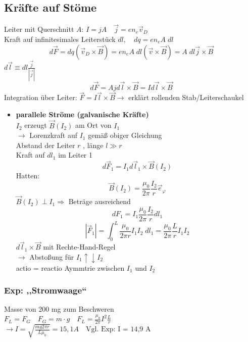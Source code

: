 \documentclass[titlepage,12pt,a4paper,ngerman]{report}
\newcommand{\tx}[1]{\textrm{#1}}
\begin{document}
\subsection{Kräfte auf Stöme}
Leiter mit Querschnitt $ A $: $ I = j A \quad \vec{j} = e n_e \vec{v}_D $\\
Kraft auf infinitesimales Leiterstück $ dl, \quad dq = e n_e A \; dl $\\
$$ d\vec{F} = dq (\vec{v}_D \times \vec{B}) = e n_e A\; dl (\vec{v} \times \vec{B}) = A \; dl \vec{j} \times \vec{B} $$
$ d\vec{l} \equiv dl \frac{\vec{j}}{| \vec{j} |}$\\
$$ d\vec{F} = A j d\vec{l} \times \vec{B} = I d\vec{l} \times \vec{B} $$
Integration über Leiter: $ \vec{F} = I \vec{l} \times \vec{B} \rightarrow $ erklärt rollenden Stab/Leiterschaukel\\
\begin{itemize}
	\item \textbf{parallele Ströme (galvanische Kräfte)}\\
	$ I_2 $ erzeugt $ \vec{B} (I_2) $ am Ort von $ I_1 $\\
	$ \rightarrow $ Lorenzkraft auf $ I_1 $ gemäß obiger Gleichung\\
	Abstand der Leiter $ r $ , länge $ l \gg r $\\
	Kraft auf $  dl_1 $ im Leiter 1\\
	$$ d\vec{F}_1  = I_1 d\vec{l}_1 \times \vec{B}(I_2) $$
	Hatten: $$ \vec{B}(I_2) = \frac{\mu_0}{2 \pi} \frac{I_2}{r} \vec{e}_\varphi $$
	$ \vec{B} (I_2) \perp I_1 \Rightarrow $ Beträge ausreichend\\
	$$ dF_1 = I_1 \frac{ \mu_0}{2 \pi} \frac{I_2}{r} dl_1 $$
	$$\boxed{ |\vec{F}_1 | = \int_0 ^L \frac{\mu _0}{2 \pi r } I_1 I_2 \; dl_1 = \frac{\mu_0}{2 \pi} \frac{L}{r} I_1 I_2}$$
	$ d\vec{l}_1 \times \vec{B} $ mit Rechte-Hand-Regel\\
	$ \rightarrow $ Abstoßung für $ I_1 \uparrow \downarrow I_2 $\\
	actio = reactio Aymmtrie zwischen $ I_1 $ und $ I_2 $ \\
\end{itemize}
\subsubsection{Exp: ,,Stromwaage``} 
Masse von 200 mg zum Beschweren\\
$ F_L = F_G \quad F_G = m \cdot g \quad F_L = \frac{\mu_0}{2 \pi} I^2 \frac{L}{r} $\\
$ \rightarrow I = \sqrt{\frac{mg 2 \pi r}{L \mu_0}}  = 15,1 A  \quad \tx{Vgl. Exp: I = 14,9 A }$
\end{document}
